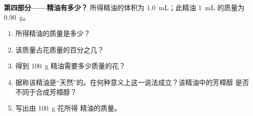 \begin{problem}
\medskip
\noindent\textbf{第四部分——精油有多少？}
所得精油的体积为 \qty{1.0}{mL}；此精油
\qty{1}{mL} 的质量为 \qty{0.90}{g}。
\begin{enumerate}[resume]
  \item 所得精油的质量是多少？
  \item 该质量占花质量的百分之几？
  \item 得到 \qty{100}{g} 精油需要多少质量的花？
  \item 据称该精油是“天然”的。在何种意义上这一说法成立？该精油中的芳樟醇
        是否不同于合成芳樟醇？
  \item 写出由 \qty{100}{g} 花所得
        精油的质量。
\end{enumerate}
\end{problem}

